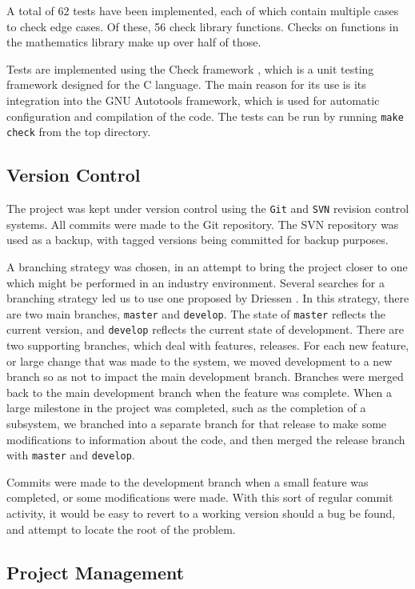 \documentclass[a4paper,11pt]{article}
\begin{document}
   A total of 62 tests have been implemented, each of which contain multiple
   cases to check edge cases. Of these, 56 check library functions. Checks on
   functions in the mathematics library make up over half of those.

   Tests are implemented using the Check framework \cite{check}, which is a unit
   testing framework designed for the C language. The main reason for its use is
   its integration into the GNU Autotools framework, which is used for automatic
   configuration and compilation of the code. The tests can be run by running
   \texttt{make check} from the top directory.
\subsection{Version Control}
\label{sec-7-4}

   The project was kept under version control using the \texttt{Git} and
   \texttt{SVN} revision control systems. All commits were made to the Git
   repository. The SVN repository was used as a backup, with tagged versions
   being committed for backup purposes.

   A branching strategy was chosen, in an attempt to bring the project closer to
   one which might be performed in an industry environment. Several searches for
   a branching strategy led us to use one proposed by Driessen
   \cite{driessen}. In this strategy, there are two main branches,
   \texttt{master} and \texttt{develop}. The state of \texttt{master} reflects
   the current version, and \texttt{develop} reflects the current state of
   development. There are two supporting branches, which deal with features,
   releases. For each new feature, or large change that was made to the system,
   we moved development to a new branch so as not to impact the main development
   branch. Branches were merged back to the main development branch when the
   feature was complete. When a large milestone in the project was completed,
   such as the completion of a subsystem, we branched into a separate branch for
   that release to make some modifications to information about the code, and
   then merged the release branch with \texttt{master} and \texttt{develop}.

   Commits were made to the development branch when a small feature was
   completed, or some modifications were made. With this sort of regular commit
   activity, it would be easy to revert to a working version should a bug be
   found, and attempt to locate the root of the problem.
\subsection{Project Management}
\label{sec-7-5}
\end{document}

